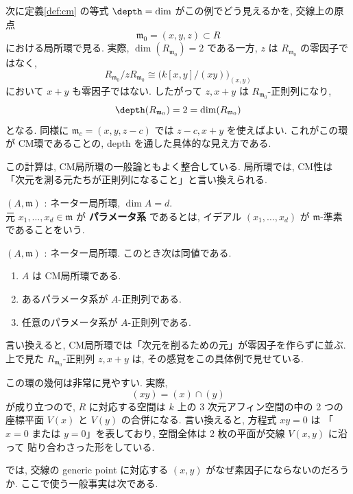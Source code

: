 \documentclass[article,paper=b5paper]{jlreq}
\begin{document}
次に定義\ref{def:cm} の等式 $\depth=\dim$ がこの例でどう見えるかを,
交線上の原点
\[
    \mathfrak{m}_0=(x,y,z)\subset R
\]
における局所環で見る. 実際, $\dim(R_{\mathfrak{m}_0})=2$ である一方,
$z$ は $R_{\mathfrak{m}_0}$ の零因子ではなく,
\[
    R_{\mathfrak{m}_0}/zR_{\mathfrak{m}_0}
    \cong \bigl(k[x,y]/(xy)\bigr)_{(x,y)}
\]
において $x+y$ も零因子ではない. したがって $z,x+y$ は $R_{\mathfrak{m}_0}$-正則列になり,
\[
    \depth(R_{\mathfrak{m}_0})=2=\dim(R_{\mathfrak{m}_0})
\]
となる. 同様に $\mathfrak{m}_c=(x,y,z-c)$ では $z-c,x+y$ を使えばよい.
これがこの環が CM環であることの, depth を通した具体的な見え方である.

この計算は, CM局所環の一般論ともよく整合している. 局所環では, CM性は
「次元を測る元たちが正則列になること」と言い換えられる.

\begin{dfn}\label{def:parameter-system}
    \quad $(A,\mathfrak{m})$ : ネーター局所環, $\dim A = d$.\\
    元 $x_1,\dots,x_d \in \mathfrak{m}$ が \textbf{パラメータ系} であるとは,
    イデアル $(x_1,\dots,x_d)$ が $\mathfrak{m}$-\hspace{0pt}準素であることをいう.
\end{dfn}

\begin{prop}\label{prop:cm-regular-sequence}
    \quad $(A,\mathfrak{m})$ : ネーター局所環. \quad このとき次は同値である.
    \begin{enumerate}[label=(\arabic*)\,]
        \item $A$ は CM局所環である.
        \item あるパラメータ系が $A$-正則列である.
        \item 任意のパラメータ系が $A$-正則列である.
    \end{enumerate}
\end{prop}

言い換えると, CM局所環では「次元を削るための元」が零因子を作らずに並ぶ.
上で見た $R_{\mathfrak{m}_0}$-正則列 $z,x+y$ は, その感覚をこの具体例で見せている.

この環の幾何は非常に見やすい. 実際,
\[
    (xy)=(x)\cap(y)
\]
が成り立つので, $R$ に対応する空間は $k$ 上の 3 次元アフィン空間の中の 2 つの座標平面
$V(x)$ と $V(y)$ の合併になる. 言い換えると, 方程式 $xy=0$ は
「$x=0$ または $y=0$」を表しており, 空間全体は 2 枚の平面が交線 $V(x,y)$ に沿って
貼り合わさった形をしている.

では, 交線の generic point に対応する $(x,y)$ がなぜ素因子にならないのだろうか.
ここで使う一般事実は次である.
\end{document}
